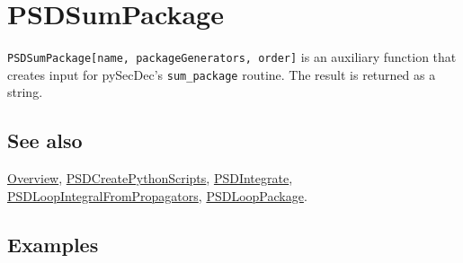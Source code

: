 \documentclass[../FeynHelpersManual.tex]{subfiles}
\begin{document}
\hypertarget{psdsumpackage}{
\section{PSDSumPackage}\label{psdsumpackage}}

\texttt{PSDSumPackage[\allowbreak{}name,\ \allowbreak{}packageGenerators,\ \allowbreak{}order]}
is an auxiliary function that creates input for pySecDec's
\texttt{sum_package} routine. The result is returned as a string.

\subsection{See also}

\hyperlink{toc}{Overview},
\hyperlink{psdcreatepythonscripts}{PSDCreatePythonScripts},
\hyperlink{psdintegrate}{PSDIntegrate},
\hyperlink{psdloopintegralfrompropagators}{PSDLoopIntegralFromPropagators},
\hyperlink{psdlooppackage}{PSDLoopPackage}.

\subsection{Examples}
\end{document}
